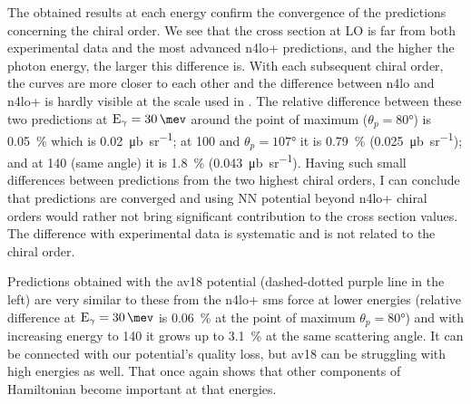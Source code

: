     The obtained results at each energy confirm the convergence 
    of the predictions concerning the chiral order.
    We see that the cross section at LO is far from both experimental 
    data and the most advanced \gls{n4lo+} predictions, and
    the higher the photon energy, the larger this
    difference is. With each subsequent chiral order, the 
    curves are more closer to each other and the difference
    between \gls{n4lo} and \gls{n4lo+} is hardly visible at the scale used in .
    The relative difference between these two predictions at $\text{E}_\gamma=\SI{30}{\mev}$ around the point of maximum 
    ($\theta_p = \ang{80}$) is \SI{0.05}{\percent} which is \SI{0.02}{\micro \barn \per \steradian};
    at \SI{100}{\mev} and $\theta_p = \ang{107}$ it is \SI{0.79}{\percent} (\SI{0.025}{\micro \barn \per \steradian});
    and at \SI{140}{\mev} (same angle) it is \SI{1.8}{\percent} (\SI{0.043}{\micro \barn \per \steradian}).
    Having such small differences between predictions from the two highest chiral orders,
    I can conclude that predictions are converged and 
    using NN potential beyond \gls{n4lo+} chiral orders would rather not bring significant contribution 
    to the cross section values. 
    The difference with experimental data is systematic 
    and is not related to the chiral order. 
    

    Predictions obtained with the \gls{av18} potential 
    (dashed-dotted purple line in the  left)
    are very similar to these from the \gls{n4lo+} \gls{sms} force at lower energies
    (relative difference at $\text{E}_\gamma=\SI{30}{\mev}$ is \SI{0.06}{\percent}
    at the point of maximum $\theta_p = \ang{80}$) and with increasing energy to \SI{140}{\mev}
    it grows up to \SI{3.1}{\percent} at the same scattering angle. 
    It can be connected with our potential's quality loss, but \gls{av18} can
    be struggling with high energies as well.
    That once again shows that other 
    components of Hamiltonian become important at that energies.

